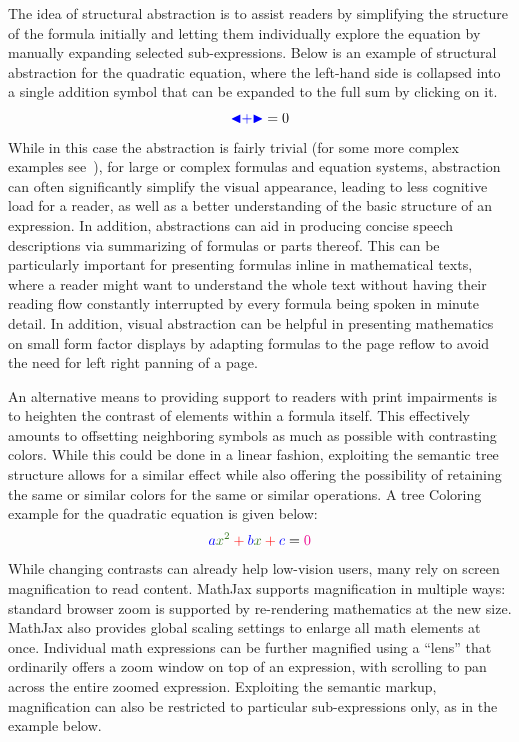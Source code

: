 \documentclass{sig-alternate}
\def\collapse#1{\textcolor{blue}{\ensuremath{\mathord{\blacktriangleleft}
\mathord{#1}
\mathord{\blacktriangleright}}}}
\begin{document}
The idea of structural abstraction is to assist readers by simplifying the
structure of the formula initially and letting them individually explore the
equation by manually expanding selected sub-expressions. Below is an example of
structural abstraction for the quadratic equation, where the left-hand side is
collapsed into a single addition symbol that can be expanded to the full sum by
clicking on it.
\[\collapse{+}=0\]
While in this case the abstraction is fairly trivial (for some more complex
examples see~\cite{cervone2016towards}), for large or complex formulas and
equation systems, abstraction can often significantly simplify the visual
appearance, leading to less cognitive load for a reader, as well as a better
understanding of the basic structure of an expression. In addition, abstractions
can aid in producing concise speech descriptions via summarizing of formulas
or parts thereof. This can be particularly important for presenting formulas
inline in mathematical texts, where a reader might want to understand the whole
text without having their reading flow constantly interrupted by every formula
being spoken in minute detail. In addition, visual abstraction can be helpful in
presenting mathematics on small form factor displays by adapting formulas to the
page reflow to avoid the need for left right panning of a page.


An alternative means to providing support to readers with print impairments is
to heighten the contrast of elements within a formula itself. This effectively
amounts to offsetting neighboring symbols as much as possible with contrasting
colors. While this could be done in a linear fashion, exploiting the semantic
tree structure allows for a similar effect while also offering the possibility
of retaining the same or similar colors for the same or similar operations. A
tree Coloring example for the quadratic equation is given below:
\[\color{blue}a \color{OliveGreen}x^2 \color{red}+ \color{blue}b
  \color{OliveGreen}x \color{red}+ \color{blue}c \color{black}= \color{magenta}0\]
While changing contrasts can already help low-vision users, many rely on screen
magnification to read content.  MathJax supports magnification in multiple ways:
standard browser zoom is supported by re-rendering mathematics at the new size.
MathJax also provides global scaling settings to enlarge all math elements at
once.  Individual math expressions can be further magnified using a ``lens''
that ordinarily offers a zoom window on top of an expression, with scrolling to
pan across the entire zoomed expression. Exploiting the semantic markup,
magnification can also be restricted to particular sub-expressions only, as in
the example below.
\end{document}
